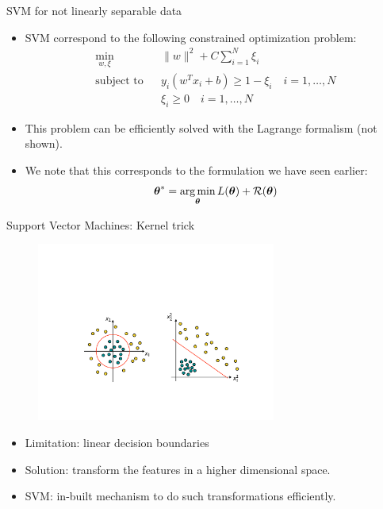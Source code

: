 \documentclass[xcolor=pdftex,dvipsnames,table]{beamer}
\begin{document}
\begin{frame}{SVM for not linearly separable data}
	\begin{itemize}
		\item SVM correspond to the following constrained optimization problem:
		\begin{eqnarray*}
			\min_{w,\xi} & & \|w\|^2 + C \sum_{i=1}^{N}\xi_i\\
			\mbox{subject to} & & y_i(w^Tx_i + b) \geq 1 - \xi_i \quad i = 1, \ldots, N \\
			& & \xi_i \geq 0 \quad i = 1, \ldots, N
		\end{eqnarray*}
		\item This problem can be efficiently solved with the Lagrange formalism (not shown).
		\item We note that this corresponds to the formulation we have seen earlier:
		\begin{equation*}
			\boldsymbol{\theta} ^{\ast} = \operatorname*{arg\,min}_{\boldsymbol{\theta}} L (\boldsymbol{\theta}) + \mathcal{R}(\boldsymbol{\theta})
		\end{equation*}
	\end{itemize}
\end{frame}

\begin{frame}{Support Vector Machines: Kernel trick}
	\begin{figure}[htb]
		\includegraphics[width=0.7\textwidth]{../graphics/KernelTrick.pdf}
	\end{figure}
	\begin{itemize}
		\item Limitation: linear decision boundaries
		\item Solution: transform the features in a higher dimensional space.
		\item SVM: in-built mechanism to do such transformations efficiently.
	\end{itemize}
\end{frame}
\end{document}

